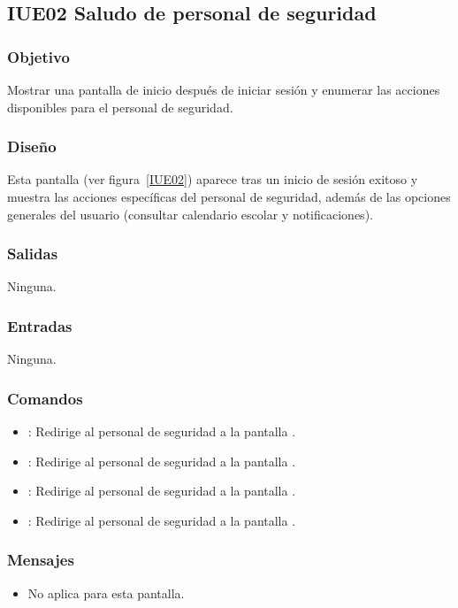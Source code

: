 \subsection{IUE02 Saludo de personal de seguridad}

\subsubsection{Objetivo}
Mostrar una pantalla de inicio después de iniciar sesión y enumerar las acciones disponibles para el personal de seguridad.

\subsubsection{Diseño}
Esta pantalla  (ver figura~\ref{IUE02}) aparece tras un inicio de sesión exitoso y muestra las acciones específicas del personal de seguridad, además de las opciones generales del usuario (consultar calendario escolar y notificaciones).


\subsubsection{Salidas}
Ninguna.

\subsubsection{Entradas}
Ninguna.

\subsubsection{Comandos}
\begin{itemize}
	\item {}: Redirige al personal de seguridad a la pantalla .
	\item {}: Redirige al personal de seguridad a la pantalla .
	\item {}: Redirige al personal de seguridad a la pantalla .
	\item {}: Redirige al personal de seguridad a la pantalla .
\end{itemize}

\subsubsection{Mensajes}
\begin{itemize}
	\item No aplica para esta pantalla.
\end{itemize}